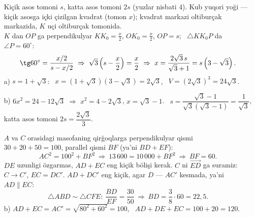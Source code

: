 \newpage
{}
Kiçik asos tomoni $s$, katta asos tomoni $2s$ (yuzlar nisbati $4$). Kub yuqori yoği — kiçik asosga içki çizilgan kvadrat (tomon $x$); kvadrat markazi oltiburçak markazida, $K$ uçi oltiburçak tomonida.\\
$K$ dan $OP$ ga perpendikulyar $KK_0=\frac x2$, $OK_0=\frac x2$, $OP=s$; \ $\triangle KK_0P$ da $\angle P=60^\circ$:
\[\tg60^\circ=\frac{x/2}{s-x/2}\ \Rightarrow\ \sqrt3\left(s-\frac x2\right)=\frac x2\ \Rightarrow\ x=\frac{2\sqrt3\,s}{\sqrt3+1}=s\left(3-\sqrt3\right).\]
a) $s=1+\sqrt3$: \ $x=\left(1+\sqrt3\right)\left(3-\sqrt3\right)=2\sqrt3$, \ $V=\left(2\sqrt3\right)^3=24\sqrt3$.

b) $6x^2=24-12\sqrt3$ $\Rightarrow$ $x^2=4-2\sqrt3$, $x=\sqrt3-1$. \ $s=\dfrac{\sqrt3-1}{\sqrt3\left(\sqrt3-1\right)}=\dfrac1{\sqrt3}$, katta asos tomoni $2s=\dfrac{2\sqrt3}3$.

\newpage
{}
$A$ va $C$ orasidagi masofaning qirğoqlarga perpendikulyar qismi $30+20+50=100$, parallel qismi $BF$ (ya'ni $BD+EF$):
\[AC^2=100^2+BF^2\ \Rightarrow\ 13\,600=10\,000+BF^2\ \Rightarrow\ BF=60.\]
$DE$ uzunligi özgarmas, $AD+EC$ eng kiçik bölişi kerak. $C$ ni $\overrightarrow{ED}$ ga suramiz: $C\to C'$, $EC=DC'$. $AD+DC'$ eng kiçik, agar $D$ — $AC'$ kesmada, ya'ni $AD\parallel EC$:
\[\triangle ABD\sim\triangle CFE:\ \frac{BD}{EF}=\frac{30}{50}\ \Rightarrow\ BD=\frac{3}{8}\cdot60=22{,}5.\]
b) $AD+EC=AC'=\sqrt{80^2+60^2}=100$, \ $AD+DE+EC=100+20=120$.

\ShowJavoblar

